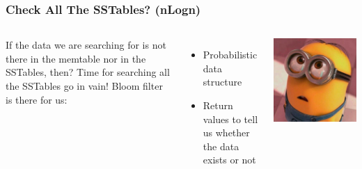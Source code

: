 \documentclass[
	11pt, 
]{beamer}
\begin{document}
\begin{frame}
    \frametitle{Check All The SSTables? (nLogn)}
    \begin{columns} 
            If the data we are searching for is not there in the memtable nor in the SSTables, then? Time for searching all the SSTables go in vain! \newline \newline
            Bloom filter is there for us: 
            \begin{itemize}
                \item Probabilistic data structure
                \item Return values to tell us whether the data exists or not
            \end{itemize}
            \includegraphics[scale=0.2]{surprise.jpg}
    \end{columns}
\end{frame}
\end{document}
